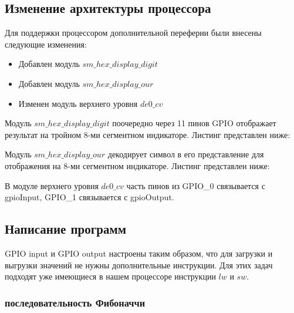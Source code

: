 \documentclass[a4paper,14pt]{article}
\begin{document}

    \subsection{Изменение архитектуры процессора}

    Для поддержки процессором дополнительной переферии были внесены следующие изменения:

    \begin{itemize}

        \item Добавлен модуль $sm\_hex\_display\_digit$

        \item Добавлен модуль $sm\_hex\_display\_our$

        \item Изменен модуль верхнего уровня $de0\_cv$

    \end{itemize}

    Модуль $sm\_hex\_display\_digit$ поочередно через 11 пинов GPIO отображает результат на тройном 8-ми сегментном индикаторе.
    Листинг представлен ниже:

    {\small {}}

    Модуль $sm\_hex\_display\_our$ декодирует символ в его представление для отображения на 8-ми сегментном индикаторе.
    Листинг представлен ниже:

    {\small {}}

    В модуле верхнего уровня $de0\_cv$ часть пинов из GPIO\_0 связывается с gpioInput, GPIO\_1 связывается с gpioOutput.

    {\small {}}

    \subsection{Написание программ}

    GPIO input и GPIO output настроены таким образом, что для загрузки и выгрузки значений не нужны дополнительные инструкции.
    Для этих задач подходят уже имеющиеся в нашем процессоре инструкции $lw$ и $sw$.

    \subsubsection{последовательность Фибоначчи}
\end{document}
